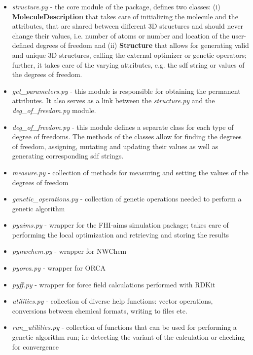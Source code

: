 \documentclass[a4paper]{article}
\begin{document}
\begin{itemize}
\item \textit{structure.py} - the core module of the package, defines two classes: (i) \textbf{MoleculeDescription} that takes care of initializing the molecule and the attributes, that are shared between different 3D structures and should never change their values, i.e. number of atoms or number and location of the user-defined degrees of freedom and (ii) \textbf{Structure} that allows for generating valid and unique 3D structures, calling the external optimizer or genetic operators; further, it takes care of the varying attributes, e.g. the sdf string or values of the degrees of freedom. 

\item \textit{get\_parameters.py} - this module is responsible for obtaining the permanent attributes. It also serves as a link between the \textit{structure.py} and the \textit{deg\_of\_freedom.py} module. 

\item \textit{deg\_of\_freedom.py} - this module defines a separate class for each type of degree of freedoms. The methods of the classes allow for finding the degrees of freedom, assigning, mutating and updating their values as well as generating corresponding sdf strings.

\item \textit{measure.py} - collection of methods for measuring and setting the values of the degrees of freedom

\item \textit{genetic\_operations.py} - collection of genetic operations needed to perform a genetic algorithm

\item \textit{pyaims.py} - wrapper for the FHI-aims simulation package; takes care of performing the local optimization and retrieving and storing the results

\item \textit{pynwchem.py} - wrapper for NWChem

\item \textit{pyorca.py} - wrapper for ORCA

\item \textit{pyff.py} - wrapper for force field calculations performed with RDKit

\item \textit{utilities.py} - collection of diverse help functions: vector operations, conversions between chemical formats, writing to files etc.

\item \textit{run\_utilities.py} - collection of functions that can be used for performing a genetic algorithm run; i.e detecting the variant of the calculation or checking for convergence

\end{itemize}
\end{document}

